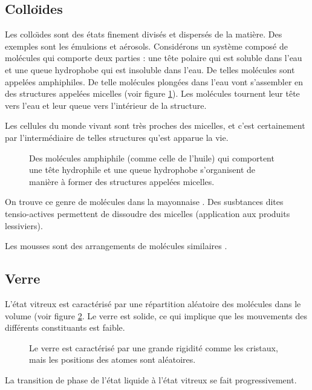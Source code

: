 \documentclass[12pt]{book}
\begin{document}
\subsection{Collo\"\i des}
Les collo\"\i des sont des \'etats finement divis\'es et dispers\'es
de la mati\`ere. Des exemples sont les \'emulsions et a\'erosols.
Consid\'erons un syst\`eme compos\'e de mol\'ecules qui comporte deux
parties : une t\^ete polaire qui est soluble dans l'eau et une queue
hydrophobe qui est insoluble dans l'eau. De telles mol\'ecules sont
appel\'ees amphiphiles. De telle mol\'ecules plong\'ees dans l'eau
vont s'assembler en des structures appel\'ees micelles (voir figure
\ref{fighuileeau}). Les mol\'ecules tournent leur t\^ete vers l'eau et
leur queue vers l'int\'erieur de la structure.
\begin{rem}
Les cellules du monde vivant sont tr\`es proches des micelles, et
c'est certainement par l'interm\'ediaire de telles structures qu'est
apparue la vie. 
\end{rem}

\begin{figure}[htb]
 \centerline{}   
 \caption{Des mol\'ecules amphiphile (comme celle de l'huile) qui
comportent une t\^ete hydrophile et une queue hydrophobe s'organisent
de mani\`ere \`a former des structures appel\'ees micelles.}
 \label{fighuileeau}
\end{figure}
On trouve ce genre de mol\'ecules dans la mayonnaise
\cite{ph:cooki:Grosser81,ph:cooki:McGee84,ph:cooki:McGee90,ph:cooki:This93}.
Des susbtances dites tensio-actives permettent de dissoudre des
micelles (application aux produits lessiviers).

Les mousses sont des arrangements de mol\'ecules similaires
\cite{ph:foams:Adamson76,ph:foams:Aubert86,ph:foams:Bikerman73}.


\subsection{Verre}
L'\'etat vitreux\cite{ph:mater:Zallen83} est caract\'eris\'e par une
r\'epartition al\'eatoire des mol\'ecules dans le volume (voir figure
\ref{figglass}. Le verre est 
solide, ce qui implique que les mouvements des diff\'erents
constituants est faible.
\begin{figure}[htb]
 \centerline{}   
 \caption{Le verre est caract\'eris\'e par une grande rigidit\'e comme
les cristaux, mais les positions des atomes sont al\'eatoires.}
 \label{figglass}
\end{figure}
La transition de phase de l'\'etat liquide \`a l'\'etat vitreux se fait
progressivement. 
\end{document}
